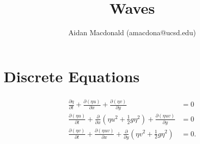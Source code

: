 \documentclass[10pt,a4paper,final]{article}
\author{Aidan Macdonald (amacdona@ucsd.edu)}
\title{Waves}
\begin{document}
\section{Discrete Equations}

\begin{align*}
{\begin{aligned}{\frac  {\partial \eta }{\partial t}}+{\frac  {\partial (\eta u)}{\partial x}}+{\frac  {\partial (\eta v)}{\partial y}}&=0\\[3pt]{\frac  {\partial (\eta u)}{\partial t}}+{\frac  {\partial }{\partial x}}\left(\eta u^{2}+{\frac  {1}{2}}g\eta ^{2}\right)+{\frac  {\partial (\eta uv)}{\partial y}}&=0\\[3pt]{\frac  {\partial (\eta v)}{\partial t}}+{\frac  {\partial (\eta uv)}{\partial x}}+{\frac  {\partial }{\partial y}}\left(\eta v^{2}+{\frac  {1}{2}}g\eta ^{2}\right)&=0.\end{aligned}}
\end{align*}
\end{document}
